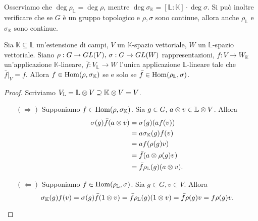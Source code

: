 Osserviamo che $\deg\rho_\mathbb{L}=\deg\rho$, mentre $\deg\sigma_\mathbb{K}=[\mathbb{L}:\mathbb{K}]\cdot\deg\sigma$. Si può inoltre verificare che se $G$ è un gruppo topologico e $\rho\comma\sigma$ sono continue, allora anche $\rho_\mathbb{L}$ e $\sigma_\mathbb{K}$ sono continue.


\begin{proposition}
Sia $\mathbb{K}\subseteq\mathbb{L}$ un'estensione di campi, $V$ un $\mathbb{K}$-spazio vettoriale, $W$ un $\mathbb{L}$-spazio vettoriale. Siano $\rho:G\to GL(V),\,\allowbreak\sigma:G\to GL(W)$ rappresentazioni, $f:V\to W_\mathbb{K}$ un'applicazione $\mathbb{K}$-lineare, $\bar{f}:V_\mathbb{L}\to W$ l'unica applicazione $\mathbb{L}$-lineare tale che $\bar{f}|_V=f$. Allora $f\in\operatorname{Hom}(\rho,\sigma_\mathbb{K})$ se e solo se $\bar{f}\in\operatorname{Hom}(\rho_\mathbb{L},\sigma)$.
\end{proposition}
\begin{proof}
Scriviamo $V_\mathbb{L}=\mathbb{L}\otimes V\supseteq\mathbb{K}\otimes V=V$.
\begin{itemize}
\item[$(\Rightarrow)$] Supponiamo $f\in\operatorname{Hom}(\rho,\sigma_\mathbb{K})$. Sia $g\in G,\,\allowbreak a\otimes v\in\mathbb{L}\otimes V$. Allora
\begin{align*}
\sigma(g)\bar{f}(a\otimes v)&=\sigma(g)(af(v))\\
&=a\sigma_\mathbb{K}(g)f(v)\\
&=af(\rho(g)v)\\
&=\bar{f}(a\otimes\rho(g)v)\\
&=\bar{f}\rho_\mathbb{L}(g)(a\otimes v).
\end{align*}
\item[$(\Leftarrow)$] Supponiamo $f\in\operatorname{Hom}(\rho_\mathbb{L},\sigma)$. Sia $g\in G\comma v\in V$. Allora
$$
\sigma_\mathbb{K}(g)f(v)=\sigma(g)\bar{f}(1\otimes v)=\bar{f}\rho_\mathbb{L}(g)(1\otimes v)=\bar{f}\rho(g)v=f\rho(g)v.
$$
\end{itemize}

\end{proof}

